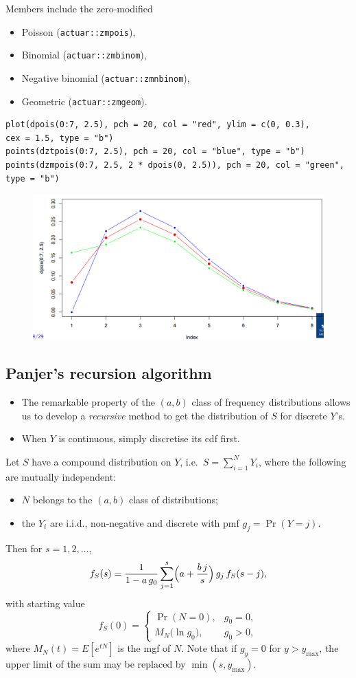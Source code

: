 \documentclass[11pt]{article}
\newcommand{\noi}{\noindent}
\begin{document}
\noi Members include the zero‐modified
\begin{itemize}
  \item Poisson (\texttt{actuar::zmpois}),
  \item Binomial (\texttt{actuar::zmbinom}),
  \item Negative binomial (\texttt{actuar::zmnbinom}),
  \item Geometric (\texttt{actuar::zmgeom}).
\end{itemize} \phantom{i}

\begin{lstlisting}
plot(dpois(0:7, 2.5), pch = 20, col = "red", ylim = c(0, 0.3),
cex = 1.5, type = "b")
points(dztpois(0:7, 2.5), pch = 20, col = "blue", type = "b")
points(dzmpois(0:7, 2.5, 2 * dpois(0, 2.5)), pch = 20, col = "green",
type = "b")
\end{lstlisting}

\begin{figure}[H]
    \centering
    \includegraphics[width=0.7\linewidth]{zero-modified dist R example.png}
\end{figure}

\subsection{Panjer’s recursion algorithm}
\noi
\begin{itemize}
  \item The remarkable property of the \((a,b)\) class of frequency distributions allows us to develop a \emph{recursive} method to get the distribution of \(S\) for discrete \(Y\)'s.
  \item When \(Y\) is continuous, simply discretise its cdf first.
\end{itemize} \phantom{i}

\noi Let \(S\) have a compound distribution on \(Y\), i.e.\ \(S=\sum_{i=1}^N Y_i\), where the following are mutually independent:
\begin{itemize}
  \item \(N\) belongs to the \((a,b)\) class of distributions;
  \item the \(Y_i\) are i.i.d., non‐negative and discrete with pmf \(g_j=\Pr(Y=j)\).
\end{itemize}
\noi Then for \(s=1,2,\dots\),
\[
f_S(s)
=\frac{1}{1 - a\,g_0}
\sum_{j=1}^{s}
\Bigl(a + \frac{b\,j}{s}\Bigr)\,g_j\,f_S(s-j),
\]
with starting value
\[
f_S(0)
=\begin{cases}
\Pr(N=0), & g_0=0,\\[0.3em]
M_N\bigl(\ln g_0\bigr), & g_0>0,
\end{cases}
\]
\noi where \(M_N(t)=E[e^{tN}]\) is the mgf of \(N\).  Note that if \(g_y=0\) for \(y>y_{\max}\), the upper limit of the sum may be replaced by \(\min(s,y_{\max})\).
\end{document}
